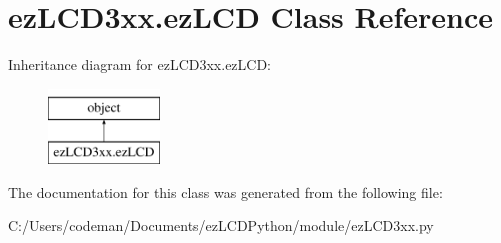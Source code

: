 \hypertarget{classez_l_c_d3xx_1_1ez_l_c_d}{\section{ez\-L\-C\-D3xx.\-ez\-L\-C\-D Class Reference}
\label{classez_l_c_d3xx_1_1ez_l_c_d}
}
Inheritance diagram for ez\-L\-C\-D3xx.\-ez\-L\-C\-D\-:\begin{figure}[H]
\begin{center}
\leavevmode
\includegraphics[height=2.000000cm]{d0/dc0/classez_l_c_d3xx_1_1ez_l_c_d}
\end{center}
\end{figure}


The documentation for this class was generated from the following file\-:\begin{DoxyCompactItemize}
\item 
C\-:/\-Users/codeman/\-Documents/ez\-L\-C\-D\-Python/module/ez\-L\-C\-D3xx.\-py\end{DoxyCompactItemize}
